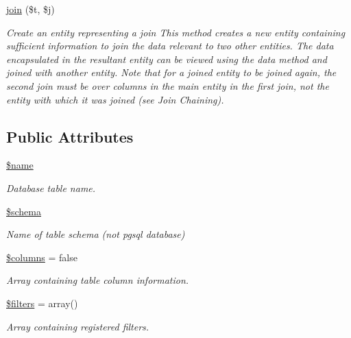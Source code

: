 \begin{DoxyCompactItemize}
\hyperlink{classentity_a4d4ed92c955fe0e4160ae7572e693be7}{join} (\$t, \$j)
\begin{DoxyCompactList}\small\item\em Create an entity representing a join This method creates a new entity containing sufficient information to join the data relevant to two other entities. The data encapsulated in the resultant entity can be viewed using the data method and joined with another entity. Note that for a joined entity to be joined again, the second join must be over columns in the main entity in the first join, not the entity with which it was joined (see Join Chaining). \end{DoxyCompactList}\end{DoxyCompactItemize}
\subsection*{Public Attributes}
\begin{DoxyCompactItemize}
\item 
\hypertarget{classentity_ae35f24992703a71e751ed6afa981380f}{\hyperlink{classentity_ae35f24992703a71e751ed6afa981380f}{\$name}}\label{classentity_ae35f24992703a71e751ed6afa981380f}

\begin{DoxyCompactList}\small\item\em Database table name. \end{DoxyCompactList}\item 
\hypertarget{classentity_a8ce4fa273c17d68fff1dd173a704b109}{\hyperlink{classentity_a8ce4fa273c17d68fff1dd173a704b109}{\$schema}}\label{classentity_a8ce4fa273c17d68fff1dd173a704b109}

\begin{DoxyCompactList}\small\item\em Name of table schema (not pgsql database) \end{DoxyCompactList}\item 
\hypertarget{classentity_a4d04649f2fb9b66924ce6a0f23633541}{\hyperlink{classentity_a4d04649f2fb9b66924ce6a0f23633541}{\$columns} = false}\label{classentity_a4d04649f2fb9b66924ce6a0f23633541}

\begin{DoxyCompactList}\small\item\em Array containing table column information. \end{DoxyCompactList}\item 
\hypertarget{classentity_a59f264aa884262d60bf96c1b750ffba8}{\hyperlink{classentity_a59f264aa884262d60bf96c1b750ffba8}{\$filters} = array()}\label{classentity_a59f264aa884262d60bf96c1b750ffba8}

\begin{DoxyCompactList}\small\item\em Array containing registered filters. \end{DoxyCompactList}\end{DoxyCompactItemize}


